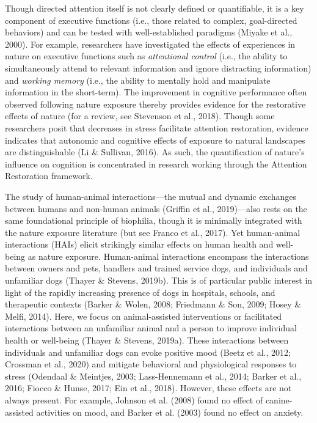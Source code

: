\documentclass[
  english,
  pub,floatsintext]{apa6}
\begin{document}
Though directed attention itself is not clearly defined or quantifiable, it is a key component of executive functions (i.e., those related to complex, goal-directed behaviors) and can be tested with well-established paradigms (Miyake et al., 2000). For example, researchers have investigated the effects of experiences in nature on executive functions such as \emph{attentional control} (i.e., the ability to simultaneously attend to relevant information and ignore distracting information) and \emph{working memory} (i.e., the ability to mentally hold and manipulate information in the short-term). The improvement in cognitive performance often observed following nature exposure thereby provides evidence for the restorative effects of nature (for a review, see Stevenson et al., 2018). Though some researchers posit that decreases in stress facilitate attention restoration, evidence indicates that autonomic and cognitive effects of exposure to natural landscapes are distinguishable (Li \& Sullivan, 2016). As such, the quantification of nature's influence on cognition is concentrated in research working through the Attention Restoration framework.

The study of human-animal interactions---the mutual and dynamic exchanges between humans and non-human animals (Griffin et al., 2019)---also rests on the same foundational principle of biophilia, though it is minimally integrated with the nature exposure literature (but see Franco et al., 2017). Yet human-animal interactions (HAIs) elicit strikingly similar effects on human health and well-being as nature exposure. Human-animal interactions encompass the interactions between owners and pets, handlers and trained service dogs, and individuals and unfamiliar dogs (Thayer \& Stevens, 2019b). This is of particular public interest in light of the rapidly increasing presence of dogs in hospitals, schools, and therapeutic contexts (Barker \& Wolen, 2008; Friedmann \& Son, 2009; Hosey \& Melfi, 2014). Here, we focus on animal-assisted interventions or facilitated interactions between an unfamiliar animal and a person to improve individual health or well-being (Thayer \& Stevens, 2019a). These interactions between individuals and unfamiliar dogs can evoke positive mood (Beetz et al., 2012; Crossman et al., 2020) and mitigate behavioral and physiological responses to stress (Odendaal \& Meintjes, 2003; Lass-Hennemann et al., 2014; Barker et al., 2016; Fiocco \& Hunse, 2017; Ein et al., 2018). However, these effects are not always present. For example, Johnson et al. (2008) found no effect of canine-assisted activities on mood, and Barker et al. (2003) found no effect on anxiety.
\end{document}
